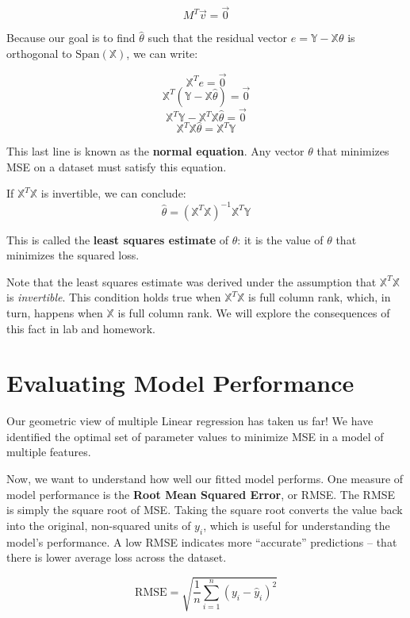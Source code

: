\documentclass[
  letterpaper,
  DIV=11,
  numbers=noendperiod]{scrreprt}
\begin{document}
\[M^T \vec{v} = \vec{0}\]

Because our goal is to find \(\hat{\theta}\) such that the residual
vector \(e = \mathbb{Y} - \mathbb{X} \theta\) is orthogonal to
\(\text{Span}(\mathbb{X})\), we can write:

\[\mathbb{X}^T e = \vec{0}\]
\[\mathbb{X}^T (\mathbb{Y} - \mathbb{X}\hat{\theta}) = \vec{0}\]
\[\mathbb{X}^T \mathbb{Y} - \mathbb{X}^T \mathbb{X} \hat{\theta} = \vec{0}\]
\[\mathbb{X}^T \mathbb{X} \hat{\theta} = \mathbb{X}^T \mathbb{Y}\]

This last line is known as the \textbf{normal equation}. Any vector
\(\theta\) that minimizes MSE on a dataset must satisfy this equation.

If \(\mathbb{X}^T \mathbb{X}\) is invertible, we can conclude:
\[\hat{\theta} = (\mathbb{X}^T \mathbb{X})^{-1} \mathbb{X}^T \mathbb{Y}\]

This is called the \textbf{least squares estimate} of \(\theta\): it is
the value of \(\theta\) that minimizes the squared loss.

Note that the least squares estimate was derived under the assumption
that \(\mathbb{X}^T \mathbb{X}\) is \emph{invertible}. This condition
holds true when \(\mathbb{X}^T \mathbb{X}\) is full column rank, which,
in turn, happens when \(\mathbb{X}\) is full column rank. We will
explore the consequences of this fact in lab and homework.

\hypertarget{evaluating-model-performance}{%
\section{Evaluating Model
Performance}\label{evaluating-model-performance}}

Our geometric view of multiple Linear regression has taken us far! We
have identified the optimal set of parameter values to minimize MSE in a
model of multiple features.

Now, we want to understand how well our fitted model performs. One
measure of model performance is the \textbf{Root Mean Squared Error}, or
RMSE. The RMSE is simply the square root of MSE. Taking the square root
converts the value back into the original, non-squared units of \(y_i\),
which is useful for understanding the model's performance. A low RMSE
indicates more ``accurate'' predictions -- that there is lower average
loss across the dataset.

\[\text{RMSE} = \sqrt{\frac{1}{n} \sum_{i=1}^n (y_i - \hat{y}_i)^2}\]
\end{document}
